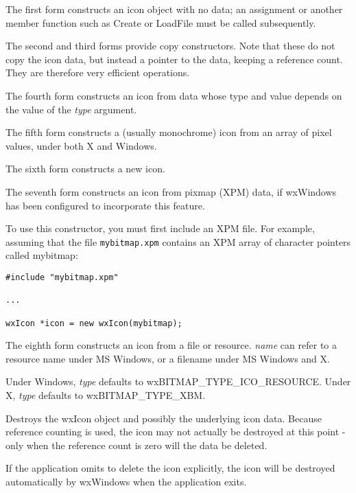 
The first form constructs an icon object with no data; an assignment or another member function such as Create
or LoadFile must be called subsequently.

The second and third forms provide copy constructors. Note that these do not copy the
icon data, but instead a pointer to the data, keeping a reference count. They are therefore
very efficient operations.

The fourth form constructs an icon from data whose type and value depends on
the value of the {\it type} argument.

The fifth form constructs a (usually monochrome) icon from an array of pixel values, under both
X and Windows.

The sixth form constructs a new icon.

The seventh form constructs an icon from pixmap (XPM) data, if wxWindows has been configured
to incorporate this feature.

To use this constructor, you must first include an XPM file. For
example, assuming that the file {\tt mybitmap.xpm} contains an XPM array
of character pointers called mybitmap:

\begin{verbatim}
#include "mybitmap.xpm"

...

wxIcon *icon = new wxIcon(mybitmap);
\end{verbatim}

The eighth form constructs an icon from a file or resource. {\it name} can refer
to a resource name under MS Windows, or a filename under MS Windows and X.

Under Windows, {\it type} defaults to wxBITMAP\_TYPE\_ICO\_RESOURCE.
Under X, {\it type} defaults to wxBITMAP\_TYPE\_XBM.





Destroys the wxIcon object and possibly the underlying icon data.
Because reference counting is used, the icon may not actually be
destroyed at this point - only when the reference count is zero will the
data be deleted.

If the application omits to delete the icon explicitly, the icon will be
destroyed automatically by wxWindows when the application exits.


